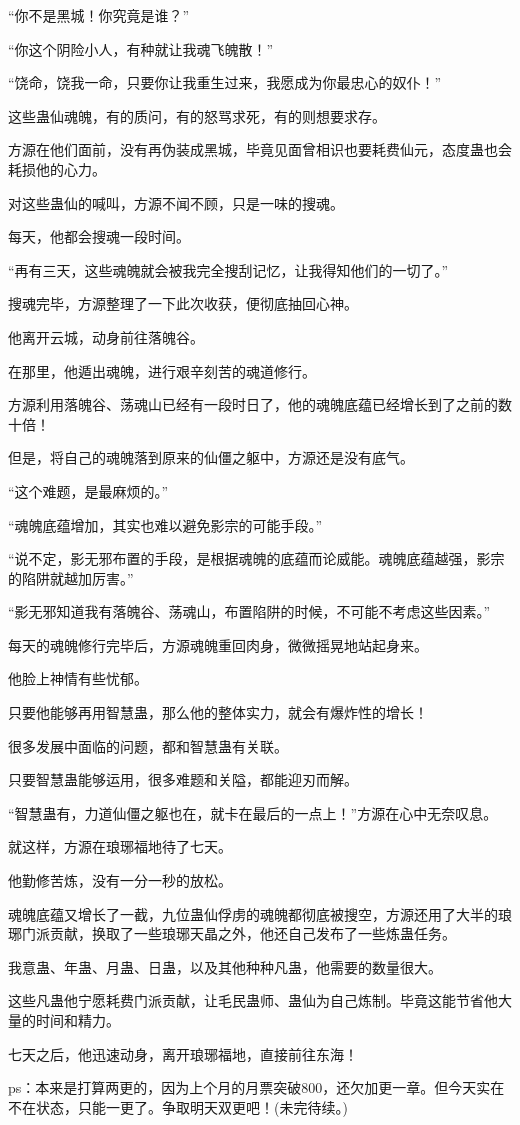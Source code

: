 \begin{this_body}
“你不是黑城！你究竟是谁？”

“你这个阴险小人，有种就让我魂飞魄散！”

“饶命，饶我一命，只要你让我重生过来，我愿成为你最忠心的奴仆！”

这些蛊仙魂魄，有的质问，有的怒骂求死，有的则想要求存。

方源在他们面前，没有再伪装成黑城，毕竟见面曾相识也要耗费仙元，态度蛊也会耗损他的心力。

对这些蛊仙的喊叫，方源不闻不顾，只是一味的搜魂。

每天，他都会搜魂一段时间。

“再有三天，这些魂魄就会被我完全搜刮记忆，让我得知他们的一切了。”

搜魂完毕，方源整理了一下此次收获，便彻底抽回心神。

他离开云城，动身前往落魄谷。

在那里，他遁出魂魄，进行艰辛刻苦的魂道修行。

方源利用落魄谷、荡魂山已经有一段时日了，他的魂魄底蕴已经增长到了之前的数十倍！

但是，将自己的魂魄落到原来的仙僵之躯中，方源还是没有底气。

“这个难题，是最麻烦的。”

“魂魄底蕴增加，其实也难以避免影宗的可能手段。”

“说不定，影无邪布置的手段，是根据魂魄的底蕴而论威能。魂魄底蕴越强，影宗的陷阱就越加厉害。”

“影无邪知道我有落魄谷、荡魂山，布置陷阱的时候，不可能不考虑这些因素。”

每天的魂魄修行完毕后，方源魂魄重回肉身，微微摇晃地站起身来。

他脸上神情有些忧郁。

只要他能够再用智慧蛊，那么他的整体实力，就会有爆炸性的增长！

很多发展中面临的问题，都和智慧蛊有关联。

只要智慧蛊能够运用，很多难题和关隘，都能迎刃而解。

“智慧蛊有，力道仙僵之躯也在，就卡在最后的一点上！”方源在心中无奈叹息。

就这样，方源在琅琊福地待了七天。

他勤修苦炼，没有一分一秒的放松。

魂魄底蕴又增长了一截，九位蛊仙俘虏的魂魄都彻底被搜空，方源还用了大半的琅琊门派贡献，换取了一些琅琊天晶之外，他还自己发布了一些炼蛊任务。

我意蛊、年蛊、月蛊、日蛊，以及其他种种凡蛊，他需要的数量很大。

这些凡蛊他宁愿耗费门派贡献，让毛民蛊师、蛊仙为自己炼制。毕竟这能节省他大量的时间和精力。

七天之后，他迅速动身，离开琅琊福地，直接前往东海！

ps：本来是打算两更的，因为上个月的月票突破800，还欠加更一章。但今天实在不在状态，只能一更了。争取明天双更吧！(未完待续。)

\end{this_body}

